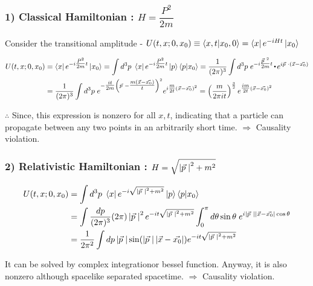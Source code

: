 \documentclass[11pt,letterpaper]{article}
\begin{document}
\subsubsection*{1) Classical Hamiltonian : $H=\dfrac{P^2}{2m}$}

Consider the transitional amplitude - $U(t,x;0,x_0) \equiv \braket{x,t|x_0,0} = \bra{x}e^{-i Ht}\ket{x_0}$

\begin{equation}
 \begin{split}
  U(t,x;0,x_0) &= \TA{x}{\tfrac{P^2}{2m}t}{x_0} = \Ip \TA{x}{\tfrac{P^2}{2m}t}{p}\braket{p|x_0} =
  \frac{1}{(2\pi)^3}\Ip e^{-i \tfrac{\vp^2}{2m}t}\ld e^{i\vp\cdot (\vec{x}-\vec{x_0})}  \\
               &= \frac{1}{(2\pi)^3}\Ip e^{-\tfrac{it}{2m}\BKS{\vp-\tfrac{m(\vec{x}-\vec{x_0})}{t}}^2}
  e^{i\tfrac{m}{2t}(\vec{x}-\vec{x_0})^2} = \BKS{\frac{m}{2\pi it}}^{\frac{3}{2}}e^{\tfrac{im}{2t}(\vec{x}-\vec{x_0})^2}
 \end{split}
\end{equation}

$\therefore$ Since, this expression is nonzero for all $x, t$, indicating that a particle can propagate between any
two points in an arbitrarily short time. $\Rightarrow$ Causality violation.

\VS

\subsubsection*{2) Relativistic Hamiltonian : $H = \sqrt{\left|\vec{p}\hspace{0.1cm}\right|^2 + m^2}$}

\begin{equation}
 \begin{split}
  U(t,x;0,x_0) &= \int{d^3p}\hspace{0.1cm} \bra{x}e^{-i \sqrt{\left|\vec{p}\hspace{0.1cm}\right|^2 + m^2}}\ket{p}\braket{p|x_0} \\
               &= \int \frac{dp}{(2\pi)^3}(2\pi)\left|\vec{p}\hspace{0.1cm}\right|^2 e^{-it\sqrt{\left|\vec{p}\hspace{0.1cm}\right|^2 + m^2}} \int_0^\pi d\theta\sin{\theta} \hspace{0.1cm} e^{i\left|\vec{p}\hspace{0.1cm}\right|\left|\vec{x}-\vec{x_0}\right|\cos{\theta}} \\
               &= \frac{1}{2\pi^2}\int dp \left|\vec{p}\hspace{0.1cm}\right|\sin(\left|\vec{p}\hspace{0.1cm}\right|\left|\vec{x}-\vec{x_0}\right|)e^{-it\sqrt{\left|\vec{p}\hspace{0.1cm}\right|^2 +m^2}}  \\
 \end{split}
\end{equation}

It can be solved by complex integration\footnotemark[1] or bessel function\footnotemark[2]. 
Anyway, it is also nonzero although spacelike separated spacetime. $\Rightarrow$ Causality violation.
\end{document}
